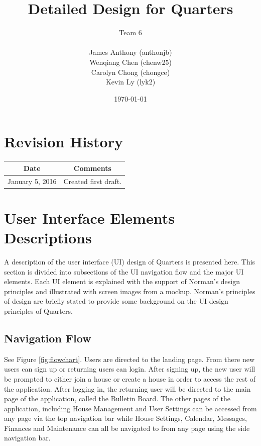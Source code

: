 \documentclass[12pt]{article}
\begin{document}
\title{Detailed Design for Quarters}
\author{Team 6\\ \\James Anthony (anthonjb)\\ Wenqiang Chen (chenw25)\\ Carolyn Chong
(chongce)\\ Kevin Ly (lyk2)}
\date{\today}

\maketitle

\pagebreak

\tableofcontents
\listoffigures

\section*{Revision History}
\begin{tabular}{|c|c|}
\hline
\textbf{Date}  & \textbf{Comments} \\ \hline
January 5, 2016 & Created first draft. \\
\hline
\end{tabular}

\pagebreak


\section{User Interface Elements Descriptions}
A description of the user interface (UI) design of Quarters is presented here. This section is divided into subsections of the UI navigation flow and the major UI elements. Each UI element is explained with the support of Norman's design principles and illustrated with screen images from a mockup. Norman's principles of design are briefly stated to provide some background on the UI design principles of Quarters.

\subsection{Navigation Flow}
See Figure \ref{fig:flowchart}. Users are directed to the landing page. From there new users can sign up or returning users can login. After signing up, the new user will be prompted to either join a house or create a house in order to access the rest of the application. After logging in, the returning user will be directed to the main page of the application, called the Bulletin Board. The other pages of the application, including House Management and User Settings can be accessed from any page via the top navigation bar while House Settings, Calendar, Messages, Finances and Maintenance can all be navigated to from any page using the side navigation bar.\\
\end{document}

